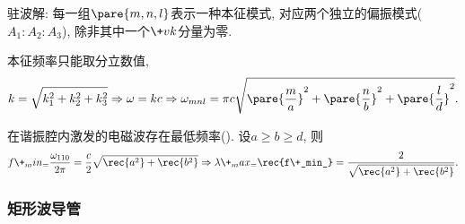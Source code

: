 \documentclass[hidelinks]{ctexart}
\begin{document}
\begin{cenum}
    \item 驻波解: 每一组$\pare{m,n,l}$表示一种本征模式, 对应两个独立的偏振模式($A_1:A_2:A_3$), 除非其中一个$\+vk$分量为零.
    \item 本征频率只能取分立数值,
    \[ k = \sqrt{k_1^2 + k_2^2 + k_3^2} \Rightarrow \omega = kc \Rightarrow \omega_{mnl} = \pi c\sqrt{\pare{\frac{m}{a}}^2 + \pare{\frac{n}{b}}^2 + \pare{\frac{l}{d}}^2}. \]
    \item 在谐振腔内激发的电磁波存在最低频率(). 设$a\ge b\ge d$, 则
    \[ f\+_min_ = \frac{\omega_{110}}{2\pi} = \frac{c}{2}\sqrt{\rec{a^2} + \rec{b^2}} \Rightarrow \lambda\+_max_ = \rec{f\+_min_} = \frac{2}{\displaystyle \sqrt{\rec{a^2} + \rec{b^2}}}. \]
\end{cenum}


\subsubsection{矩形波导管} %
\label{ssub:矩形波导管}
\end{document}
